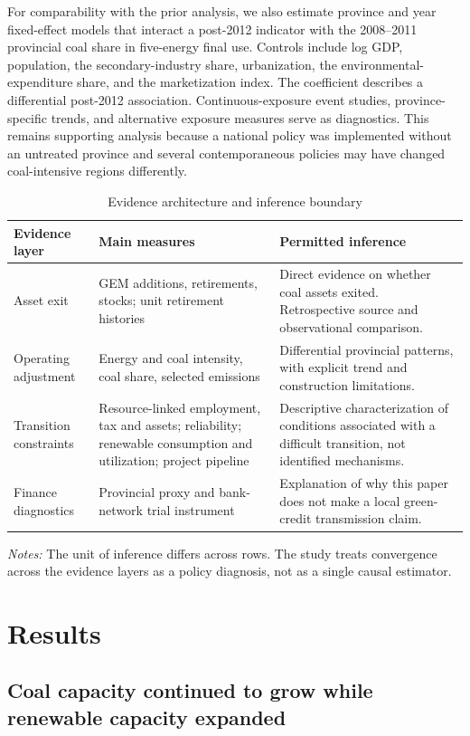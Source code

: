 \documentclass[11pt]{article}
\newcommand{\note}[1]{\begin{minipage}{0.96\textwidth}\footnotesize\textit{Notes:} #1\end{minipage}}
\begin{document}
For comparability with the prior analysis, we also estimate province and year fixed-effect models that interact a post-2012 indicator with the 2008--2011 provincial coal share in five-energy final use. Controls include log GDP, population, the secondary-industry share, urbanization, the environmental-expenditure share, and the marketization index. The coefficient describes a differential post-2012 association. Continuous-exposure event studies, province-specific trends, and alternative exposure measures serve as diagnostics. This remains supporting analysis because a national policy was implemented without an untreated province and several contemporaneous policies may have changed coal-intensive regions differently.

\begin{table}[H]
\centering
\small
\caption{Evidence architecture and inference boundary}
\label{tab:architecture}
\begin{tabularx}{\textwidth}{p{3.5cm}p{3.5cm}X}
\toprule
Evidence layer & Main measures & Permitted inference \\
\midrule
Asset exit & GEM additions, retirements, stocks; unit retirement histories & Direct evidence on whether coal assets exited. Retrospective source and observational comparison. \\
Operating adjustment & Energy and coal intensity, coal share, selected emissions & Differential provincial patterns, with explicit trend and construction limitations. \\
Transition constraints & Resource-linked employment, tax and assets; reliability; renewable consumption and utilization; project pipeline & Descriptive characterization of conditions associated with a difficult transition, not identified mechanisms. \\
Finance diagnostics & Provincial proxy and bank-network trial instrument & Explanation of why this paper does not make a local green-credit transmission claim. \\
\bottomrule
\end{tabularx}
\note{The unit of inference differs across rows. The study treats convergence across the evidence layers as a policy diagnosis, not as a single causal estimator.}
\end{table}

\section{Results}

\subsection{Coal capacity continued to grow while renewable capacity expanded}
\end{document}
